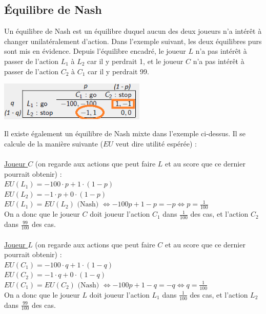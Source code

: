 \documentclass[a4paper, 12pt]{article}
\newcommand{\alinea}{
\hspace*{0.5cm}}
\begin{document}
	\subsection{\'Equilibre de Nash}
		\alinea Un équilibre de Nash est un équilibre duquel aucun des deux joueurs n'a intérêt à changer unilatéralement d'action.
			Dans l'exemple suivant, les deux équilibres purs sont mis en évidence. Depuis l'équilibre encadré, le joueur $L$ n'a pas
			intérêt à passer de l'action $L_1$ à $L_2$ car il y perdrait 1, et le joueur $C$ n'a pas intérêt à passer de l'action $C_2$
			à $C_1$ car il y perdrait 99.
		\begin{center}
			\includegraphics[width=2.75in]{Images/nash}
		\end{center}
		\alinea Il existe également un équilibre de Nash mixte dans l'exemple ci-dessus. Il se calcule de la manière suivante 
			($EU$ veut dire utilité espérée) :  \\
		~\\
		\ul{Joueur $C$} (on regarde aux actions que peut faire $L$ et au score que ce dernier pourrait obtenir) : \\ 
		$EU(L_1) = -100\cdot p + 1 \cdot (1 - p)$ \\
		$EU(L_2) = -1 \cdot p + 0 \cdot (1 - p)$ \\
		$EU(L_1) = EU(L_2) \text{ (Nash) } \Leftrightarrow -100p + 1 - p = -p \Leftrightarrow p = \frac{1}{100}$\\
		On a donc que le joueur $C$ doit joueur l'action $C_1$ dans $\frac{1}{100}$ des cas, et l'action $C_2$ dans $\frac{99}{100}$ 
			des cas.\\~\\
		\ul{Joueur $L$} (on regarde aux actions que peut faire $C$ et au score que ce dernier pourrait obtenir) : \\ 
		$EU(C_1) = -100\cdot q + 1 \cdot (1 - q)$ \\
		$EU(C_2) = -1 \cdot q + 0 \cdot (1 - q)$ \\
		$EU(C_1) = EU(C_2) \text{ (Nash) } \Leftrightarrow -100p + 1 - q = -q \Leftrightarrow q = \frac{1}{100}$\\
		On a donc que le joueur $L$ doit joueur l'action $L_1$ dans $\frac{1}{100}$ des cas, et l'action $L_2$ dans $\frac{99}{100}$ 
			des cas.
\end{document}
